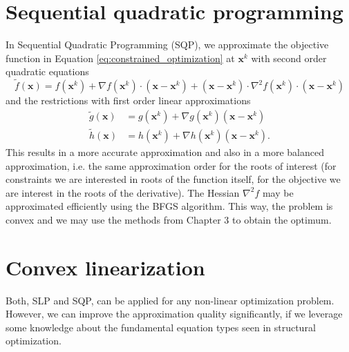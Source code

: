 \section{Sequential quadratic programming}
In Sequential Quadratic Programming (SQP), we approximate the objective function in Equation \eqref{eq:constrained_optimization} at $\mathbf{x}^k$ with second order quadratic equations  
\begin{equation}
    \tilde{f}(\mathbf{x}) = f(\mathbf{x}^k) + \nabla f (\mathbf{x}^k) \cdot \left(\mathbf{x} - \mathbf{x}^k \right) + \left(\mathbf{x} - \mathbf{x}^k \right) \cdot \nabla^2 f(\mathbf{x}^k) \cdot \left(\mathbf{x} - \mathbf{x}^k \right)
\end{equation}
and the restrictions with first order linear approximations
\begin{align}
    \tilde{g}(\mathbf{x}) &= g(\mathbf{x}^k) + \nabla g(\mathbf{x}^k) \left(\mathbf{x} - \mathbf{x}^k \right) \\
    \tilde{h}(\mathbf{x}) &= h(\mathbf{x}^k) + \nabla h(\mathbf{x}^k) \left(\mathbf{x} - \mathbf{x}^k \right).
\end{align}
This results in a more accurate approximation and also in a more balanced approximation, i.e. the same approximation order for the roots of interest (for constraints we are interested in roots of the function itself, for the objective we are interest in the roots of the derivative). 
The Hessian $\nabla^2 f$ may be approximated efficiently using the BFGS algorithm. This way, the problem is convex and we may use the methods from Chapter 3 to obtain the optimum. 

\section{Convex linearization}
Both, SLP and SQP, can be applied for any non-linear optimization problem. However, we can improve the approximation quality significantly, if we leverage some knowledge about the fundamental equation types seen in structural optimization.

